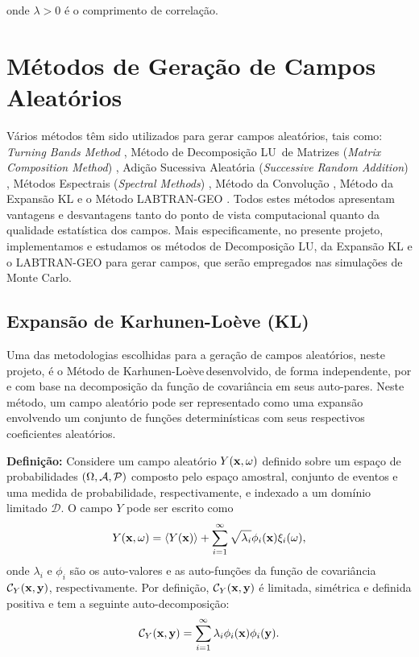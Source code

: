 \documentclass[12pt,a4paper,portuges]{article}
\newcommand{\LU}{{LU}}
\newcommand{\kl}{KL}
\newcommand{\KL}{{Karhunen-Lo\`eve}}
\newcommand{\Y}{{Y}}
\newcommand{\ale}{\omega}
\newcommand{\Dom}{\mathcal{D}}
\newcommand{\Yxw}{\Y(\vx,\ale)}
\newcommand{\ava}{\lambda}
\newcommand{\avai}{\ava_{i}}
\newcommand{\ave}{\phi}
\newcommand{\avei}{\ave_{i}}
\begin{document}
\noindent onde $\lambda > 0$ é  o comprimento de correlação.

\section{Métodos de Geração de Campos Aleatórios}

Vários métodos têm sido utilizados para gerar campos aleatórios, 
tais como: {\em
Turning Bands Method} \citep{mantoglou82,oh98}, Método de Decomposição \LU\ de Matrizes ({\em Matrix
Composition Method}) \citep{clifton82,elishakoff83}, Adição Sucessiva Aleatória ({\em Successive
Random Addition}) \citep{oh98,kikkinides99,kikkinides00}, Métodos Espectrais ({\em Spectral
Methods}) \citep{bruining97}, Método da Convolução \citep{furtado90,glimm93}, Método da Expansão KL
\citep{karhunen46,loeve55} e o Método LABTRAN-GEO \citep{mrborges08g}. Todos estes métodos
apresentam vantagens e desvantagens tanto do ponto de vista computacional quanto da qualidade
estatística dos campos. Mais especificamente, no presente projeto, implementamos e estudamos os
métodos de Decomposição \LU, da Expansão KL e o LABTRAN-GEO para gerar campos, que serão empregados
nas simulações de Monte Carlo.

\subsection{Expansão de Karhunen-Loève (\kl)}
\label{chap:mod_estocastica}
Uma das metodologias escolhidas para a geração de campos aleatórios, neste projeto, é o Método de
\KL\,desenvolvido, de forma independente, por  \cite{karhunen46} e \cite{loeve55} com base na
decomposição da função de covariância em seus auto-pares. Neste método, um campo aleatório pode ser
representado como uma expansão envolvendo um conjunto de funções determinísticas com seus
respectivos coeficientes aleatórios.

\textbf{Definição:}
Considere um campo aleatório $\Y(\vx,\ale)$ definido sobre um espaço de probabilidades
$(\Omega,\mathcal{A},\mathcal{P})$ composto pelo espaço amostral, conjunto de eventos e uma medida de
probabilidade, respectivamente, e indexado a um domínio limitado $\Dom$. O campo $\Y$ pode ser
escrito como 
%
\begin{equation}
  \Yxw = \med{\Y(\vx)} +\sum_{i=1}^{\infty}\sqrt{\avai} \avei(\vx)
\xi_{i}(\ale),
\label{kl}
\end{equation}
%
\noindent onde $\avai$ e $\avei$ são os auto-valores e as auto-funções da função de covariância
$\covv{\Y}$, respectivamente. Por definição,  $\covv{\Y}$ é limitada, simétrica e definida positiva
e tem a seguinte auto-decomposição:
%
\begin{equation}
  \covv{\Y} = \sum_{i=1}^{\infty} \avai\avei(\vx)\avei(\vy).
\label{klcov}
\end{equation}
%
\end{document}
